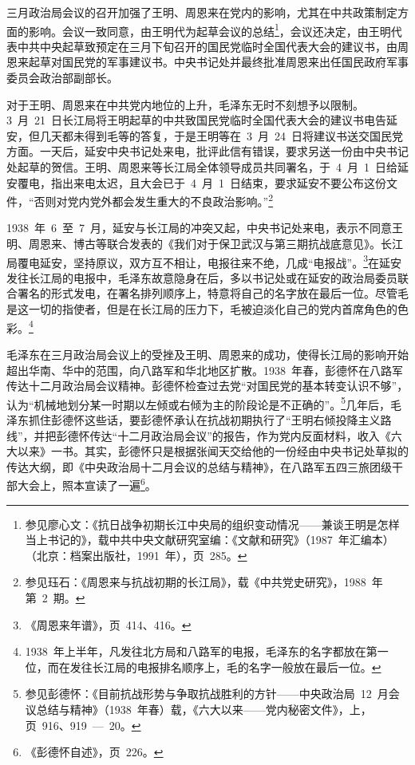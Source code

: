 三月政治局会议的召开加强了王明、周恩来在党内的影响，尤其在中共政策制定方面的影响。会议一致同意，由王明代为起草会议的总结\footnote{参见廖心文：《抗日战争初期长江中央局的组织变动情况——兼谈王明是怎样当上书记的》，载中共中央文献研究室编：《文献和研究》（1987~年汇编本）（北京：档案出版社，1991~年），页~285。}，会议还决定，由王明代表中共中央起草致预定在三月下旬召开的国民党临时全国代表大会的建议书，由周恩来起草对国民党的军事建议书。中央书记处并最终批准周恩来出任国民政府军事委员会政治部副部长。

对于王明、周恩来在中共党内地位的上升，毛泽东无时不刻想予以限制。3~月~21~日长江局将王明起草的中共致国民党临时全国代表大会的建议书电告延安，但几天都未得到毛等的答复，于是王明等在~3~月~24~日将建议书送交国民党方面。一天后，延安中央书记处来电，批评此信有错误，要求另送一份由中央书记处起草的贺信。王明、周恩来等长江局全体领导成员共同署名，于~4~月~1~日给延安覆电，指出来电太迟，且大会已于~4~月~1~日结束，要求延安不要公布这份文件，“否则对党内党外都会发生重大的不良政治影响。”\footnote{参见珏石：《周恩来与抗战初期的长江局》，载《中共党史研究》，1988~年第~2~期。}

1938~年~6~至~7~月，延安与长江局的冲突又起，中央书记处来电，表示不同意王明、周恩来、博古等联合发表的《我们对于保卫武汉与第三期抗战底意见》。长江局覆电延安，坚持原议，双方互不相让，电报往来不绝，几成“电报战”。\footnote{《周恩来年谱》，页~414、416。}在延安发往长江局的电报中，毛泽东故意隐身在后，多以书记处或在延安的政治局委员联合署名的形式发电，在署名排列顺序上，特意将自己的名字放在最后一位。尽管毛是这一切的指使者，但是在长江局的压力下，毛被迫淡化自己的党内首席角色的色彩。\footnote{1938~年上半年，凡发往北方局和八路军的电报，毛泽东的名字都放在第一位，而在发往长江局的电报排名顺序上，毛的名字一般放在最后一位。}

毛泽东在三月政治局会议上的受挫及王明、周恩来的成功，使得长江局的影响开始超出华南、华中的范围，向八路军和华北地区扩散。1938~年春，彭德怀在八路军传达十二月政治局会议精神。彭德怀检查过去党“对国民党的基本转变认识不够”，认为“机械地划分某一时期以左倾或右倾为主的阶段论是不正确的”。\footnote{参见彭德怀：《目前抗战形势与争取抗战胜利的方针——中央政治局~12~月会议总结与精神》（1938~年春）载，《六大以来——党内秘密文件》，上，页~916、919~—~20。}几年后，毛泽东抓住彭德怀这些话，要彭德怀承认在抗战初期执行了“王明右倾投降主义路线”，并把彭德怀传达“十二月政治局会议”的报告，作为党内反面材料，收入《六大以来》一书。其实，彭德怀只是根据张闻天交给他的一份经由中央书记处草拟的传达大纲，即《中央政治局十二月会议的总结与精神》，在八路军五四三旅团级干部大会上，照本宣读了一遍\footnote{《彭德怀自述》，页~226。}。

